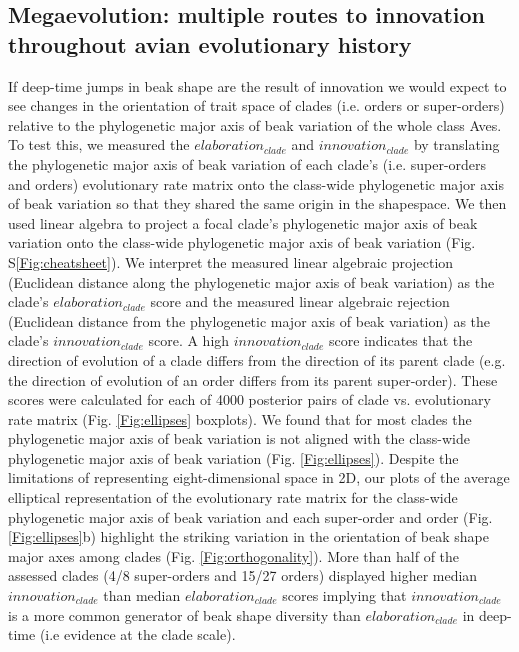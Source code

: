\documentclass[12pt,letterpaper]{article}
\begin{document}
\subsection{Megaevolution: multiple routes to innovation throughout avian evolutionary history}
If deep-time jumps in beak shape \cite{cooney2017mega} are the result of innovation we would expect to see changes in the orientation of trait space of clades (i.e. orders or super-orders) relative to the phylogenetic major axis of beak variation of the whole class Aves.
To test this, we measured the $elaboration_{clade}$ and $innovation_{clade}$ by translating the phylogenetic major axis of beak variation of each clade's (i.e. super-orders and orders) evolutionary rate matrix onto the class-wide phylogenetic major axis of beak variation so that they shared the same origin in the shapespace.
We then used linear algebra to project %
a focal clade's phylogenetic major axis of beak variation onto the class-wide phylogenetic major axis of beak variation (Fig. S\ref{Fig:cheatsheet}).
We interpret the measured linear algebraic projection (Euclidean distance along the phylogenetic major axis of beak variation) as the clade's $elaboration_{clade}$ score and the measured linear algebraic rejection (Euclidean distance from the phylogenetic major axis of beak variation) as the clade's $innovation_{clade}$ score. %
A high $innovation_{clade}$ score indicates that the direction of evolution of a clade differs from the direction of its parent clade (e.g. the direction of evolution of an order differs from its parent super-order).
These scores were calculated for each of 4000 posterior pairs of clade vs.
evolutionary rate matrix (Fig. \ref{Fig:ellipses} boxplots).
We found that for most clades the phylogenetic major axis of beak variation is not aligned with the class-wide phylogenetic major axis of beak variation (Fig. \ref{Fig:ellipses}).
Despite the limitations of representing eight-dimensional space in 2D, our plots of the average elliptical representation of the evolutionary rate matrix for the class-wide phylogenetic major axis of beak variation and each super-order and order (Fig. \ref{Fig:ellipses}b) highlight the striking variation in the orientation of beak shape major axes among clades (Fig. \ref{Fig:orthogonality}).
More than half of the assessed clades (4/8 super-orders and 15/27 orders) displayed higher median $innovation_{clade}$ than median $elaboration_{clade}$ scores implying that $innovation_{clade}$ is a more common generator of beak shape diversity than $elaboration_{clade}$ in deep-time (i.e evidence at the clade scale).
\end{document}
